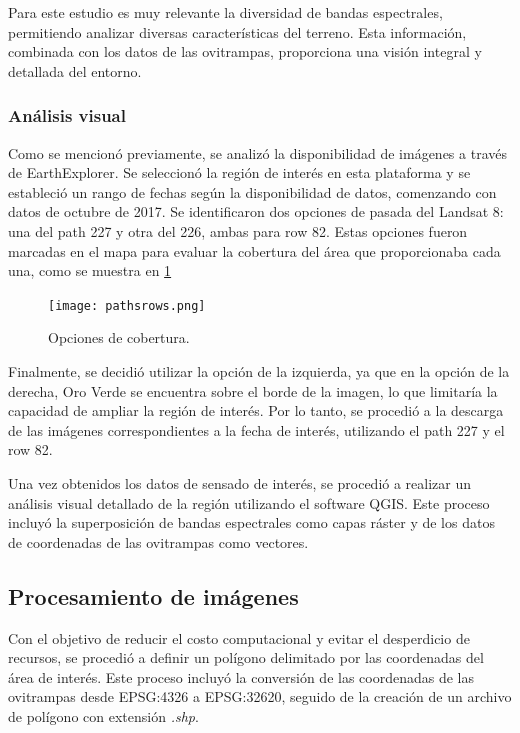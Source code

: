 Para este estudio es muy relevante la diversidad de bandas espectrales, permitiendo analizar diversas características del terreno. Esta información, combinada con los datos de las ovitrampas, proporciona una visión integral y detallada del entorno.


\subsubsection{Análisis visual}

Como se mencionó previamente, se analizó la disponibilidad de imágenes a través de EarthExplorer. Se seleccionó la región de interés en esta plataforma y se estableció un rango de fechas según la disponibilidad de datos, comenzando con datos de  octubre de 2017. Se identificaron dos opciones de pasada del Landsat 8: una del path 227 y otra del 226, ambas para row 82. Estas opciones fueron marcadas en el mapa para evaluar la cobertura del área que proporcionaba cada una, como se muestra en \figurename \ref{fig:paths-rows}

\begin{figure}[H]
	\texttt{[image: pathsrows.png]}
	\centering
	\caption{Opciones de cobertura.}
	\label{fig:paths-rows}
	
\end{figure}

Finalmente, se decidió utilizar la opción de la izquierda, ya que en la opción de la derecha, Oro Verde se encuentra sobre el borde de la imagen, lo que limitaría la capacidad de ampliar la región de interés. Por lo tanto, se procedió a la descarga de las imágenes correspondientes a la fecha de interés, utilizando el path 227 y el row 82.

Una vez obtenidos los datos de sensado de interés, se procedió a realizar un análisis visual detallado de la región utilizando el software QGIS. Este proceso incluyó la superposición de bandas espectrales como capas ráster y de los datos de coordenadas de las ovitrampas como vectores.

\subsection{Procesamiento de imágenes}


Con el objetivo de reducir el costo computacional y evitar el desperdicio de recursos, se procedió a definir un polígono delimitado por las coordenadas del área de interés. Este proceso incluyó la conversión de las coordenadas de las ovitrampas desde EPSG:4326 a EPSG:32620, seguido de la creación de un archivo de polígono con extensión \textit{.shp}.

